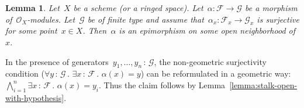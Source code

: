 \documentclass[10pt,reqno,a4paper]{amsbook}
\makeatletter
\theoremstyle{definition}
\theoremstyle{plain}
\newtheorem{lemma}[defn]{Lemma}
\theoremstyle{remark}
\newcommand{\F}{\mathcal{F}}
\newcommand{\G}{\mathcal{G}}
\renewcommand{\O}{\mathcal{O}}
\newcommand{\?}{\,{:}\,}
\renewcommand{\_}{\mathpunct{.}\,}
\renewenvironment{proof}[1][\proofname]{\par
  \pushQED{\qed}%
  \normalfont \topsep6\p@\@plus6\p@\relax
  \trivlist
  \item[\hskip\labelsep
        \itshape
    #1\@addpunct{.}]\ignorespaces
}{%
  \popQED\endtrivlist\@endpefalse
}
\makeatother
\begin{document}
\begin{lemma}Let~$X$ be a scheme (or a ringed space). Let~$\alpha : \F \to \G$ be
a morphism of~$\O_X$-modules. Let~$\G$ be of finite type and assume
that~$\alpha_x : \F_x \to \G_x$ is surjective for some point~$x \in X$.
Then~$\alpha$ is an epimorphism on some open neighborhood of~$x$.\end{lemma}
\begin{proof}In the presence of generators~$y_1,\ldots,y_n\?\G$, the
non-geometric surjectivity condition ($\forall y\?\G\_ \exists x\?\F\_
\alpha(x) = y$) can be reformulated in a geometric way: $\bigwedge_{i=1}^n
\exists x\?\F\_ \alpha(x) = y_i$. Thus the claim follows by
Lemma~\ref{lemma:stalk-open-with-hypothesis}.\end{proof}

\end{document}
